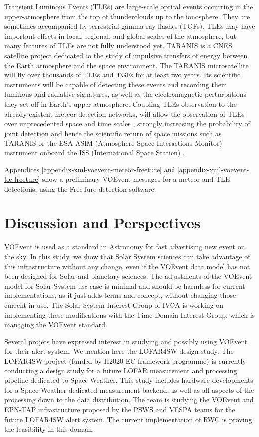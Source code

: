 \documentclass[referee,a4paper,12pt,traditabstract]{swsc}
\begin{document}
\begin{linenumbers}
Transient Luminous Events (TLEs) are large-scale optical events occurring in the upper-atmosphere from the top of thunderclouds up to the ionosphere. They are sometimes accompanied by terrestrial gamma-ray flashes (TGFs). TLEs may have important effects in local, regional, and global scales of the atmosphere, but many features of TLEs are not fully understood yet. TARANIS is a CNES satellite project dedicated to the study of impulsive transfers of energy between the Earth atmosphere and the space environment. The TARANIS microsatellite will fly over thousands of TLEs and TGFs for at least two years. Its scientific instruments will be capable of detecting these events and recording their luminous and radiative signatures, as well as the electromagnetic perturbations they set off in Earth's upper atmosphere. Coupling TLEs observation to the already existent meteor detection networks, will allow the observation of TLEs over unprecedented space and time scales \cite{2017AGUFMAE23A2469G}, strongly increasing the probability of joint detection and hence the scientific return of space missions such as TARANIS or the ESA ASIM (Atmosphere-Space Interactions Monitor) instrument onboard the ISS (International Space Station) \cite{2009AIPC.1118....8N}.

Appendices \ref{appendix-xml-voevent-meteor-freeture} and  \ref{appendix-xml-voevent-tle-freeture} show a preliminary VOEvent messages for a meteor and TLE detections, using the FreeTure \cite{2014pim4.conf...39A} detection software. 

\section{Discussion and Perspectives}

VOEvent is used as a standard in Astronomy for fast advertising new event on the sky. In this study, we show that Solar System sciences can take advantage of this infrastructure without any change, even if the VOEvent data model has not been designed for Solar and planetary sciences. The adjustments of the VOEvent model for Solar System use case is minimal and should be harmless for current implementations, as it just adds terms and concept, without changing those current in use. The Solar System Interest Group of IVOA is working on implementing these modifications with the Time Domain Interest Group, which is managing the VOEvent standard. 

Several projets have expressed interest in studying and possibly using VOEvent for their alert system. We mention here the LOFAR4SW design study.
The LOFAR4SW project (funded by H2020 EC framework programme) is currently conducting a design study for a future LOFAR measurement and processing pipeline dedicated to Space Weather. This study includes hardware developments for a Space Weather dedicated measurement backend, as well as all aspects of the processing down to the data distribution. The team is studying the VOEvent and EPN-TAP infrastructure proposed by the PSWS and VESPA teams for the future LOFAR4SW alert system. The current implementation of RWC is proving the feasibility in this domain. 


\end{linenumbers}
\end{document}
